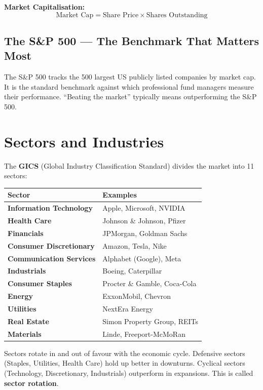 \begin{formulabox}
\textbf{Market Capitalisation:}
\[
  \text{Market Cap} = \text{Share Price} \times \text{Shares Outstanding}
\]
\end{formulabox}

\subsection{The S\&P 500 — The Benchmark That Matters Most}
The S\&P 500 tracks the 500 largest US publicly listed companies by market cap.
It is the standard benchmark against which professional fund managers measure their performance.
``Beating the market'' typically means outperforming the S\&P 500.

\section{Sectors and Industries}

The \textbf{GICS} (Global Industry Classification Standard) divides the market into
11 sectors:

\begin{center}
\begin{tabular}{>{\bfseries}p{4.5cm} p{8cm}}
\toprule
Sector & Examples \\
\midrule
Information Technology & Apple, Microsoft, NVIDIA \\
Health Care & Johnson \& Johnson, Pfizer \\
Financials & JPMorgan, Goldman Sachs \\
Consumer Discretionary & Amazon, Tesla, Nike \\
Communication Services & Alphabet (Google), Meta \\
Industrials & Boeing, Caterpillar \\
Consumer Staples & Procter \& Gamble, Coca-Cola \\
Energy & ExxonMobil, Chevron \\
Utilities & NextEra Energy \\
Real Estate & Simon Property Group, REITs \\
Materials & Linde, Freeport-McMoRan \\
\bottomrule
\end{tabular}
\end{center}

\begin{notebox}
Sectors rotate in and out of favour with the economic cycle. Defensive sectors (Staples, Utilities,
Health Care) hold up better in downturns. Cyclical sectors (Technology, Discretionary, Industrials)
outperform in expansions. This is called \textbf{sector rotation}.
\end{notebox}


